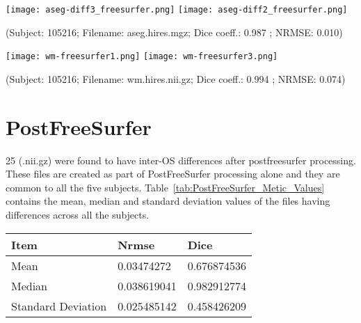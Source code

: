 \hfill \break
\begin{center}
\texttt{[image: aseg-diff3\_freesurfer.png]}%
\texttt{[image: aseg-diff2\_freesurfer.png]}
\caption*{(Subject: 105216; Filename: aseg.hires.mgz; Dice coeff.: 0.987 ; NRMSE: 0.010)}
\label{fig:freesurfer_aseg_file}
\end{center}

\hfill \break
\begin{center}
\texttt{[image: wm-freesurfer1.png]}%
\texttt{[image: wm-freesurfer3.png]}
\caption*{(Subject: 105216; Filename: wm.hires.nii.gz; Dice coeff.: 0.994 ; NRMSE: 0.074)}
\label{fig:freesurfer_wm_file}
\end{center}

\section{PostFreeSurfer}\label{sec:Postfreesurfer}
25 (.nii.gz) were found to have inter-OS differences after postfreesurfer processing. These files are created as part of PostFreeSurfer processing alone and they are common to all the five subjects. Table~\ref{tab:PostFreeSurfer_Metic_Values} contains the mean, median and standard deviation values of the files having differences across all the subjects.
\hfill \break
\begin{center}
\begin{tabular}{|l|l|l|}
\hline
\textbf{Item}      & \textbf{Nrmse} & \textbf{Dice} \\ \hline
Mean               & 0.03474272     & 0.676874536   \\ \hline
Median             & 0.038619041    & 0.982912774   \\ \hline
Standard Deviation & 0.025485142    & 0.458426209   \\ \hline
\end{tabular}
\label{tab:PostFreeSurfer_Metic_Values}
\end{center}
\hfill \break

